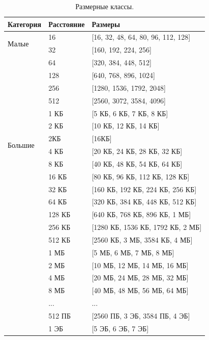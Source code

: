 \begin{table}[h!]
	\begin{center}
		\begin{tabular}{l|l|l}
			\textbf{Категория} & \textbf{Расстояние} & \textbf{Размеры}\\
			\hline
			\multirow{2}{*}{Малые} & 16 & [16, 32, 48, 64, 80, 96, 112, 128]\\
			& 32 & [160, 192, 224, 256]\\
			& 64 & [320, 384, 448, 512]\\
			& 128 & [640, 768, 896, 1024]\\
			& 256 & [1280, 1536, 1792, 2048]\\
			& 512 & [2560, 3072, 3584, 4096]\\
			& 1 КБ & [5 КБ, 6 КБ, 7 КБ, 8 КБ]\\
			& 2 КБ & [10 КБ, 12 КБ, 14 КБ]\\
			\hline
			\multirow{2}{*}{Большие} & 2КБ & [16КБ]\\
			& 4 КБ &	[20 КБ, 24 КБ, 28 КБ, 32 КБ]\\
			& 8 КБ & [40 КБ, 48 КБ, 54 КБ, 64 КБ]\\
			& 16 КБ & [80 КБ, 96 КБ, 112 КБ, 128 КБ]\\
			& 32 КБ & [160 КБ, 192 КБ, 224 КБ, 256 КБ]\\
			& 64 КБ & [320 КБ, 384 КБ, 448 КБ, 512 КБ]\\
			& 128 КБ & [640 КБ, 768 КБ, 896 КБ, 1 МБ]\\
			& 256 КБ & [1280 КБ, 1536 КБ, 1792 КБ, 2 МБ]\\
			& 512 КБ & [2560 КБ, 3 МБ, 3584 КБ, 4 МБ]\\
			& 1 МБ &	[5 МБ, 6 МБ, 7 МБ, 8 МБ]\\
			& 2 МБ &	[10 МБ, 12 МБ, 14 МБ, 16 МБ]\\
			& 4 МБ &	[20 МБ, 24 МБ, 28 МБ, 32 МБ]\\
			& 8 МБ &	[40 МБ, 48 МБ, 56 МБ, 64 МБ]\\
			&  ... & ...\\
			& 512 ПБ &	[2560 ПБ, 3 ЭБ, 3584 ПБ, 4 ЭБ]\\
			& 1 ЭБ	& [5 ЭБ, 6 ЭБ, 7 ЭБ]\\
		\end{tabular}
		\caption{Размерные классы.}
		\label{jemalloc-size-classes}
	\end{center}
\end{table}

